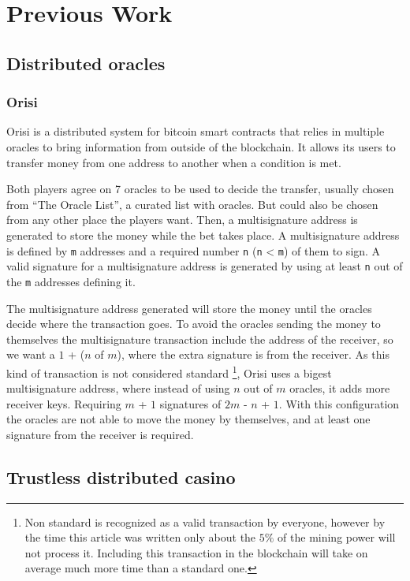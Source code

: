\section{Previous Work}

\subsection{Distributed oracles}

\subsubsection{Orisi}
Orisi\cite{orisiwhitepaper} is a distributed system for bitcoin smart contracts
  that relies in multiple oracles to bring information from outside of the
  blockchain.
It allows its users to transfer money from one address to another when a
  condition is met.

Both players agree on 7 oracles to be used to decide the transfer, usually
  chosen from ``The Oracle List'', a curated list with oracles. But could also
  be chosen from any other place the players want. Then, a multisignature
  address is generated to store the money while the bet takes place.
A multisignature address is defined by \texttt{m} addresses and a required
  number \texttt{n} (\texttt{n} < \texttt{m}) of them to sign. A valid
  signature for a multisignature address is generated by using at least
  \texttt{n} out of the \texttt{m} addresses defining it.

The multisignature address generated will store the money until the oracles
  decide where the transaction goes. To avoid the oracles sending the money
  to themselves the multisignature transaction include the address of the
  receiver, so we want a $1$ + ($n$ of $m$), where the extra signature is
  from the receiver. As this kind of transaction is not considered standard
  \footnote{Non standard is recognized as a valid transaction by everyone,
  however by the time this article was written only about the $5\%$ of the
  mining power will not process it. Including this transaction in the
  blockchain will take on average much more time than a standard one.},
  Orisi uses a bigest multisignature address, where instead of using
  $n$ out of $m$ oracles, it adds more receiver keys. Requiring $m$ + $1$
  signatures of $2m$ - $n$ + $1$. With this configuration the oracles are
  not able to move the money by themselves, and at least one signature
  from the receiver is required.

\subsection{Trustless distributed casino}

